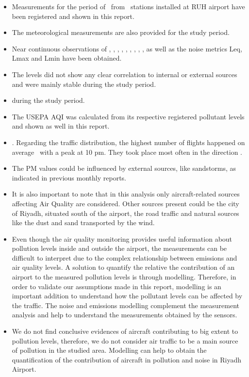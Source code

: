 \documentclass[12pt, oneside]{book}
\begin{document}
\begin{itemize}
\item Measurements for the period of \monthyear \ from \fullstations\ stations installed at RUH airport have been registered and shown in this report.
\item The meteorological measurements are also provided for the study period.
\item Near continuous observations of , , , , , , , , ,  as well as the noise metrics Leq, Lmax and Lmin have been obtained. 
\item The  levels did not show any clear correlation to internal or external sources and were mainly stable during the study period.
\item \concLimits during the study period.
\item The USEPA AQI was calculated from its respective registered pollutant levels and shown as well in this report.
\item \concAQI. Regarding the traffic distribution, the highest number of flights happened on average  \trafficPeriod\ with a peak at 10 pm. They took place most often in the direction \maxRunway.  
\item The PM values could be influenced by external sources, like sandstorms, as indicated in previous monthly reports.
\item It is also important to note that in this analysis only aircraft-related sources affecting Air Quality are considered. Other sources present could be the city of Riyadh, situated south of the airport, the road traffic and natural sources like the dust and sand transported by the wind.
\item Even though the air quality monitoring provides useful information about pollution levels inside and outside the airport, the measurements can be difficult to interpret due to the complex relationship between emissions and air quality levels. A solution to quantify the relative the contribution of an airport to the measured pollution levels is through modelling. Therefore, in order to validate our assumptions made in this report, modelling is an important addition to understand how the pollutant levels can be affected by the traffic. The noise and emissions modelling complement the measurement analysis and help to understand the measurements obtained by the sensors. 
\item We do not find conclusive evidences of aircraft contributing to big extent to pollution levels, therefore, we do not consider air traffic to be a main source of pollution in the studied area. Modelling can help to obtain the quantification of the contribution of aircraft in pollution and noise in Riyadh Airport.
\end{itemize}
\end{document}
